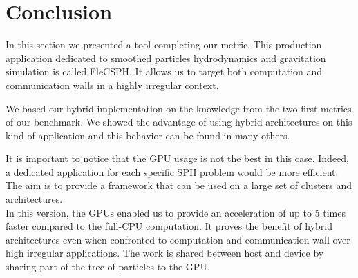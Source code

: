 \section{Conclusion}
In this section we presented a tool completing our metric. 
This production application dedicated to smoothed particles hydrodynamics and gravitation simulation is called FleCSPH. 
It allows us to target both computation and communication walls in a highly irregular context.

We based our hybrid implementation on the knowledge from the two first metrics of our benchmark.
We showed the advantage of using hybrid architectures on this kind of application and this behavior can be found in many others. 

It is important to notice that the GPU usage is not the best in this case. 
Indeed, a dedicated application for each specific SPH problem would be more efficient. 
The aim is to provide a framework that can be used on a large set of clusters and architectures.\\

In this version, the GPUs enabled us to provide an acceleration of up to 5 times faster compared to the full-CPU computation.
It proves the benefit of hybrid architectures even when confronted to computation and communication wall over high irregular applications. 
The work is shared between host and device by sharing part of the tree of particles to the GPU. 
